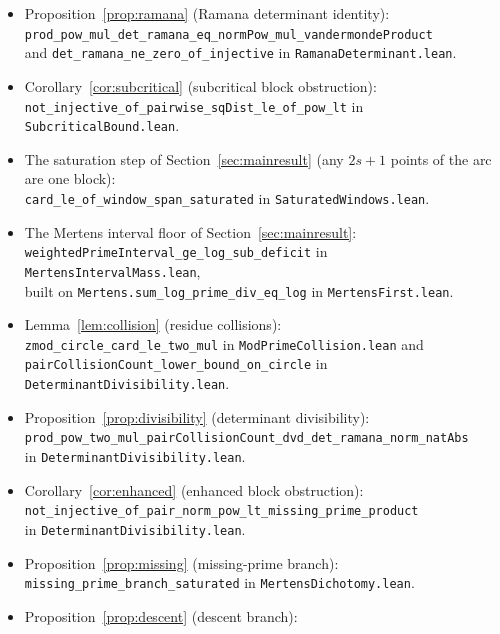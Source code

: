 \documentclass[11pt]{article}
\begin{document}
\begin{itemize}[leftmargin=2em]
\item Proposition~\ref{prop:ramana} (Ramana determinant identity):\\
\texttt{prod\_pow\_mul\_det\_ramana\_eq\_normPow\_mul\_vandermondeProduct}\\
and \texttt{det\_ramana\_ne\_zero\_of\_injective} in \texttt{RamanaDeterminant.lean}.
\item Corollary~\ref{cor:subcritical} (subcritical block obstruction):\\
\texttt{not\_injective\_of\_pairwise\_sqDist\_le\_of\_pow\_lt} in \texttt{SubcriticalBound.lean}.
\item The saturation step of Section~\ref{sec:mainresult} (any \(2s+1\) points of the arc are one block):\\
\texttt{card\_le\_of\_window\_span\_saturated} in \texttt{SaturatedWindows.lean}.
\item The Mertens interval floor of Section~\ref{sec:mainresult}:\\
\texttt{weightedPrimeInterval\_ge\_log\_sub\_deficit} in \texttt{MertensIntervalMass.lean},\\
built on \texttt{Mertens.sum\_log\_prime\_div\_eq\_log} in \texttt{MertensFirst.lean}.
\item Lemma~\ref{lem:collision} (residue collisions):\\
\texttt{zmod\_circle\_card\_le\_two\_mul} in \texttt{ModPrimeCollision.lean} and\\
\texttt{pairCollisionCount\_lower\_bound\_on\_circle} in \texttt{DeterminantDivisibility.lean}.
\item Proposition~\ref{prop:divisibility} (determinant divisibility):\\
\texttt{prod\_pow\_two\_mul\_pairCollisionCount\_dvd\_det\_ramana\_norm\_natAbs}\\
in \texttt{DeterminantDivisibility.lean}.
\item Corollary~\ref{cor:enhanced} (enhanced block obstruction):\\
\texttt{not\_injective\_of\_pair\_norm\_pow\_lt\_missing\_prime\_product}\\
in \texttt{DeterminantDivisibility.lean}.
\item Proposition~\ref{prop:missing} (missing-prime branch):\\
\texttt{missing\_prime\_branch\_saturated} in \texttt{MertensDichotomy.lean}.
\item Proposition~\ref{prop:descent} (descent branch):\\

\end{itemize}
\end{document}
